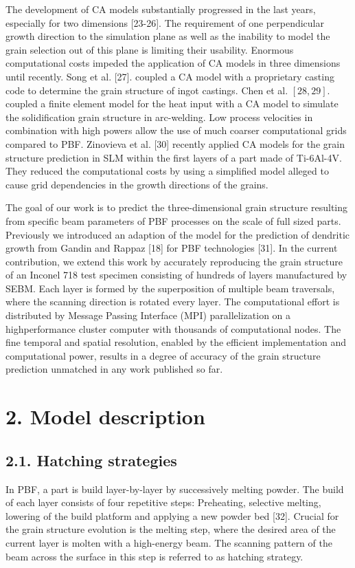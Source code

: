 \documentclass[10pt]{article}
\begin{document}
The development of CA models substantially progressed in the last years, especially for two dimensions [23-26]. The requirement of one perpendicular growth direction to the simulation plane as well as the inability to model the grain selection out of this plane is limiting their usability. Enormous computational costs impeded the application of CA models in three dimensions until recently. Song et al. [27]. coupled a CA model with a proprietary casting code to determine the grain structure of ingot castings. Chen et al. $[28,29]$. coupled a finite element model for the heat input with a CA model to simulate the solidification grain structure in arc-welding. Low process velocities in combination with high powers allow the use of much coarser computational grids compared to PBF. Zinovieva et al. [30] recently applied CA models for the grain structure prediction in SLM within the first layers of a part made of Ti-6Al-4V. They reduced the computational costs by using a simplified model alleged to cause grid dependencies in the growth directions of the grains.

The goal of our work is to predict the three-dimensional grain structure resulting from specific beam parameters of PBF processes on the scale of full sized parts. Previously we introduced an adaption of the model for the prediction of dendritic growth from Gandin and Rappaz [18] for PBF technologies [31]. In the current contribution, we extend this work by accurately reproducing the grain structure of an Inconel 718 test specimen consisting of hundreds of layers manufactured by SEBM. Each layer is formed by the superposition of multiple beam traversals, where the scanning direction is rotated every layer. The computational effort is distributed by Message Passing Interface (MPI) parallelization on a highperformance cluster computer with thousands of computational nodes. The fine temporal and spatial resolution, enabled by the efficient implementation and computational power, results in a degree of accuracy of the grain structure prediction unmatched in any work published so far.

\section*{2. Model description}
\subsection*{2.1. Hatching strategies}
In PBF, a part is build layer-by-layer by successively melting powder. The build of each layer consists of four repetitive steps: Preheating, selective melting, lowering of the build platform and applying a new powder bed [32]. Crucial for the grain structure evolution is the melting step, where the desired area of the current layer is molten with a high-energy beam. The scanning pattern of the beam across the surface in this step is referred to as hatching strategy.
\end{document}
